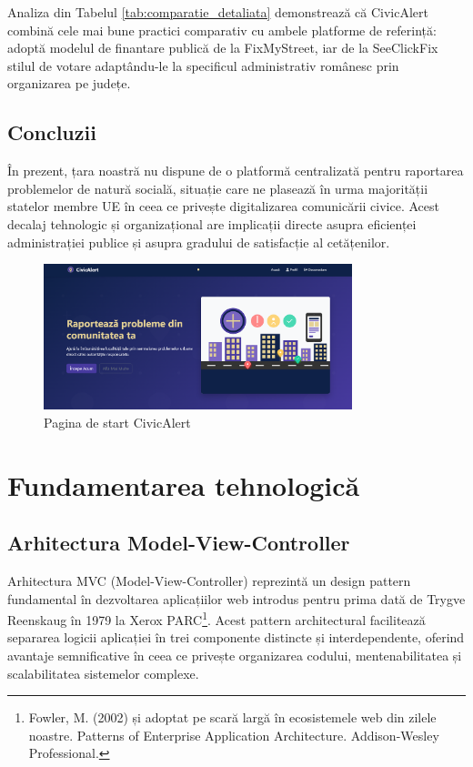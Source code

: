 \documentclass[12pt,a4paper]{report}
\begin{document}
Analiza din Tabelul \ref{tab:comparatie_detaliata} demonstrează că CivicAlert combină cele mai bune practici comparativ cu  ambele platforme de referință: adoptă modelul de finantare publică de la FixMyStreet, iar  de la SeeClickFix stilul de votare  adaptându-le la specificul administrativ românesc prin organizarea pe județe.

\section{Concluzii}

În prezent, țara noastră nu dispune de o platformă centralizată pentru raportarea problemelor de natură socială, situație care ne plasează  în urma majorității statelor membre UE în ceea ce privește digitalizarea comunicării civice. Acest decalaj tehnologic și organizațional are implicații directe asupra eficienței administrației publice și asupra gradului de satisfacție al cetățenilor.

\begin{figure}[H]
    \centering
    \includegraphics[width=0.8\textwidth]{homepage.png}
    \caption{Pagina de start  CivicAlert}
    \label{fig:homepage}
\end{figure}

\chapter{Fundamentarea tehnologică}

\section{Arhitectura Model-View-Controller}

Arhitectura MVC (Model-View-Controller) reprezintă un design pattern fundamental în dezvoltarea aplicațiilor web introdus pentru prima dată de Trygve Reenskaug în 1979 la Xerox PARC\footnote{Fowler, M. (2002) și adoptat pe scară largă în ecosistemele web din zilele noastre. Patterns of Enterprise Application Architecture. Addison-Wesley Professional.}. Acest pattern architectural facilitează separarea logicii aplicației în trei componente distincte și interdependente, oferind avantaje semnificative în ceea ce privește organizarea codului, mentenabilitatea și scalabilitatea sistemelor complexe.
\end{document}
